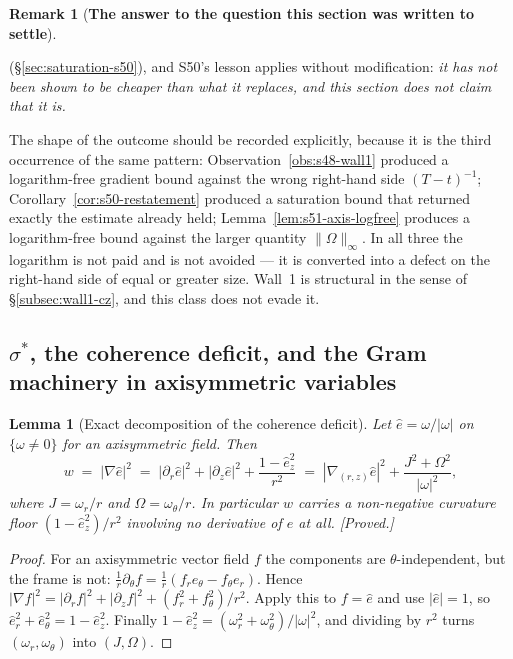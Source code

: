 \documentclass[11pt]{article}
\newtheorem{lemma}[theorem]{Lemma}
\theoremstyle{definition}
\newtheorem{remark}[theorem]{Remark}
\theoremstyle{remark}
\begin{document}
\begin{remark}[\textbf{The answer to the question this section was written to
  settle}]
\begin{enumerate}[label=\textup{(\alph*)},leftmargin=2.4em]
    (\S\ref{sec:saturation-s50}), and S50's lesson applies without
    modification: \emph{it has not been shown to be cheaper than what it
    replaces, and this section does not claim that it is.}
  \end{enumerate}
  The shape of the outcome should be recorded explicitly, because it is the
  third occurrence of the same pattern: Observation~\ref{obs:s48-wall1}
  produced a logarithm-free gradient bound against the wrong right-hand side
  $(T-t)^{-1}$; Corollary~\ref{cor:s50-restatement} produced a saturation
  bound that returned exactly the estimate already held;
  Lemma~\ref{lem:s51-axis-logfree} produces a logarithm-free bound against the
  larger quantity $\|\Omega\|_\infty$. In all three the logarithm is not paid
  and is not avoided --- it is converted into a defect on the right-hand side
  of equal or greater size. Wall~1 is structural in the sense of
  \S\ref{subsec:wall1-cz}, and this class does not evade it.
\end{remark}

\subsection{\texorpdfstring{$\sigma^*$}{sigma*}, the coherence deficit, and
the Gram machinery in axisymmetric variables}
\label{subsec:s51-sigma}

\begin{lemma}[Exact decomposition of the coherence deficit]
  \label{lem:s51-w-identity}
  Let $\hat e=\omega/|\omega|$ on $\{\omega\neq0\}$ for an axisymmetric field.
  Then
  \begin{equation}\label{eq:s51-w}
    w \;=\; |\nabla\hat e|^2
    \;=\; |\partial_r\hat e|^2 + |\partial_z\hat e|^2
      + \frac{1-\hat e_z^2}{r^2}
    \;=\; |\nabla_{(r,z)}\hat e|^2
      + \frac{J^2+\Omega^2}{|\omega|^2},
  \end{equation}
  where $J=\omega_r/r$ and $\Omega=\omega_\theta/r$. In particular $w$ carries
  a non-negative \emph{curvature floor} $(1-\hat e_z^2)/r^2$ involving no
  derivative of $\hat e$ at all. \emph{[Proved.]}
\end{lemma}
\begin{proof}
  For an axisymmetric vector field $f$ the components are
  $\theta$-independent, but the frame is not:
  $\tfrac1r\partial_\theta f=\tfrac1r(f_re_\theta-f_\theta e_r)$. Hence
  $|\nabla f|^2=|\partial_rf|^2+|\partial_zf|^2+(f_r^2+f_\theta^2)/r^2$.
  Apply this to $f=\hat e$ and use $|\hat e|=1$, so
  $\hat e_r^2+\hat e_\theta^2=1-\hat e_z^2$. Finally
  $1-\hat e_z^2=(\omega_r^2+\omega_\theta^2)/|\omega|^2$, and dividing by
  $r^2$ turns $(\omega_r,\omega_\theta)$ into $(J,\Omega)$.
\end{proof}
\end{document}
